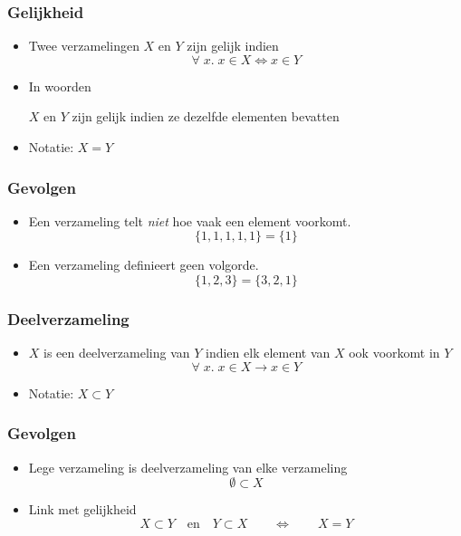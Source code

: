 \documentclass[dutch]{beamer}
\begin{document}
\begin{frame}
  \frametitle{Gelijkheid}
  \begin{itemize}
    \item Twee verzamelingen $X$ en $Y$ zijn gelijk indien
          \[ \forall \; x. \; x \in X \iff x \in Y \]
          \vskip5mm
    \item In woorden
          \begin{center}
            $X$ en $Y$ zijn gelijk indien ze dezelfde elementen bevatten
          \end{center}
          \vskip5mm
    \item Notatie: $X = Y$
  \end{itemize}
\end{frame}

\begin{frame}
  \frametitle{Gevolgen}
  \begin{itemize}
    \item Een verzameling telt \emph{niet} hoe vaak een element voorkomt.
          \[ \{ 1, 1, 1, 1, 1 \} = \{ 1 \} \]
    \item Een verzameling definieert geen volgorde.
          \[ \{ 1, 2, 3 \} = \{ 3, 2, 1 \} \]
  \end{itemize}
\end{frame}

\begin{frame}
  \frametitle{Deelverzameling}
  \begin{center}
  \end{center}
  \begin{itemize}
    \item $X$ is een deelverzameling van $Y$ indien elk element van $X$ ook voorkomt in $Y$
          \[
            \forall \; x. \; x \in X \rightarrow x \in Y
          \]
    \item Notatie: $X \subset Y$
  \end{itemize}
\end{frame}

\begin{frame}
  \frametitle{Gevolgen}
  \begin{itemize}
    \item Lege verzameling is deelverzameling van elke verzameling
          \[ \emptyset \subset X \]
    \item Link met gelijkheid
          \[ X \subset Y \quad\textrm{en}\quad Y \subset X \qquad\iff\qquad X = Y \]
  \end{itemize}
\end{frame}
\end{document}
